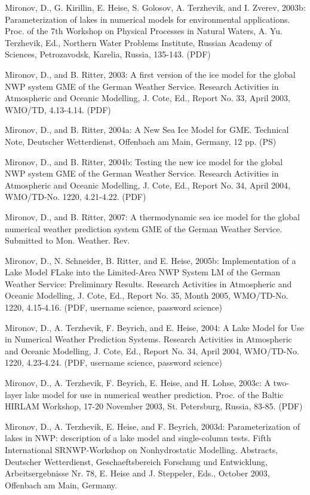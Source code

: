 \begin{description}
Mironov, D., G. Kirillin, E. Heise, S. Golosov, A. Terzhevik, and I. Zverev, 2003b: Parameterization of lakes in numerical models for environmental applications. Proc. of the 7th Workshop on Physical Processes in Natural Waters, A. Yu. Terzhevik, Ed., Northern Water Problems Institute, Russian Academy of Sciences, Petrozavodsk, Karelia, Russia, 135-143. (PDF) 
\item
Mironov, D., and B. Ritter, 2003: A first version of the ice model for the global NWP system GME of the German Weather Service. Research Activities in Atmospheric and Oceanic Modelling, J. Cote, Ed., Report No. 33, April 2003, WMO/TD, 4.13-4.14. (PDF)
\item
Mironov, D., and B. Ritter, 2004a: A New Sea Ice Model for GME. Technical Note, Deutscher Wetterdienst, Offenbach am Main, Germany, 12 pp. (PS) 
\item
Mironov, D., and B. Ritter, 2004b: Testing the new ice model for the global NWP system GME of the German Weather Service. Research Activities in Atmospheric and Oceanic Modelling, J. Cote, Ed., Report No. 34, April 2004, WMO/TD-No. 1220, 4.21-4.22.  (PDF) 
\item
Mironov, D., and B. Ritter, 2007: A thermodynamic sea ice model for the global numerical weather prediction system GME of the German Weather Service. Submitted to Mon. Weather. Rev.
\item
Mironov, D., N. Schneider, B. Ritter, and E. Heise, 2005b: Implementation of a Lake Model FLake into the Limited-Area NWP System LM of the German Weather Service: Preliminary Results. Research Activities in Atmospheric and Oceanic Modelling, J. Cote, Ed., Report No. 35, Month 2005, WMO/TD-No. 1220, 4.15-4.16. (PDF, username science, password science)
\item
Mironov, D., A. Terzhevik, F. Beyrich, and E. Heise, 2004: A Lake Model for Use in Numerical Weather Prediction Systems. Research Activities in Atmospheric and Oceanic Modelling, J. Cote, Ed., Report No. 34, April 2004, WMO/TD-No. 1220, 4.23-4.24. (PDF, username science, password science)
\item
Mironov, D., A. Terzhevik, F. Beyrich, E. Heise, and H. Lohse, 2003c: A two-layer lake model for use in numerical weather prediction. Proc. of the Baltic HIRLAM Workshop, 17-20 November 2003, St. Petersburg, Russia, 83-85. (PDF) 
\item
Mironov, D., A. Terzhevik, E. Heise, and F. Beyrich, 2003d: Parameterization of lakes in NWP: description of a lake model and single-column tests. Fifth International SRNWP-Workshop on Nonhydrostatic Modelling. Abstracts, Deutscher Wetterdienst, Geschaeftsbereich Forschung und Entwicklung, Arbeitsergebnisse Nr. 78, E. Heise and J. Steppeler, Eds., October 2003, Offenbach am Main, Germany.

\end{description}
